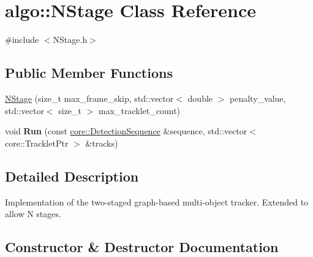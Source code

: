 \hypertarget{classalgo_1_1NStage}{}\section{algo\+:\+:N\+Stage Class Reference}
\label{classalgo_1_1NStage}


{\ttfamily \#include $<$N\+Stage.\+h$>$}

\subsection*{Public Member Functions}
\begin{DoxyCompactItemize}
\item 
\hyperlink{classalgo_1_1NStage_a0a4b4141e1e9f5fa53773c7aae49087f}{N\+Stage} (size\+\_\+t max\+\_\+frame\+\_\+skip, std\+::vector$<$ double $>$ penalty\+\_\+value, std\+::vector$<$ size\+\_\+t $>$ max\+\_\+tracklet\+\_\+count)
\item 
void {\bfseries Run} (const \hyperlink{classcore_1_1DetectionSequence}{core\+::\+Detection\+Sequence} \&sequence, std\+::vector$<$ core\+::\+Tracklet\+Ptr $>$ \&tracks)\hypertarget{classalgo_1_1NStage_a4e4e881b9c6f65d9e86449c71ab6d778}{}\label{classalgo_1_1NStage_a4e4e881b9c6f65d9e86449c71ab6d778}

\end{DoxyCompactItemize}


\subsection{Detailed Description}
Implementation of the two-\/staged graph-\/based multi-\/object tracker. Extended to allow N stages. 

\subsection{Constructor \& Destructor Documentation}
